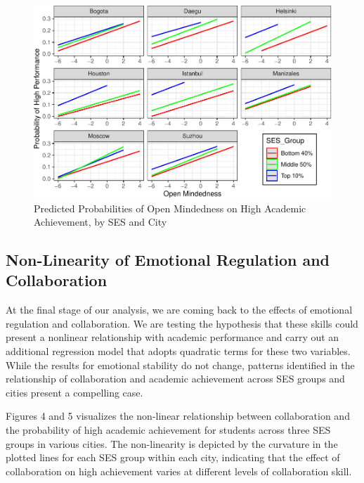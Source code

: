 \documentclass[
  12pt,
  a4paper,
]{article}
\begin{document}
\begin{figure}
\centering
\includegraphics{ncs_and_academic_achievementRmd_files/figure-latex/scatter open-1.pdf}
\caption{Predicted Probabilities of Open Mindedness on High Academic
Achievement, by SES and City}
\end{figure}

\hypertarget{non-linearity-of-emotional-regulation-and-collaboration}{%
\subsection{Non-Linearity of Emotional Regulation and
Collaboration}\label{non-linearity-of-emotional-regulation-and-collaboration}}

At the final stage of our analysis, we are coming back to the effects of
emotional regulation and collaboration. We are testing the hypothesis
that these skills could present a nonlinear relationship with academic
performance and carry out an additional regression model that adopts
quadratic terms for these two variables. While the results for emotional
stability do not change, patterns identified in the relationship of
collaboration and academic achievement across SES groups and cities
present a compelling case.

Figures 4 and 5 visualizes the non-linear relationship between
collaboration and the probability of high academic achievement for
students across three SES groups in various cities. The non-linearity is
depicted by the curvature in the plotted lines for each SES group within
each city, indicating that the effect of collaboration on high
achievement varies at different levels of collaboration skill.
\end{document}
